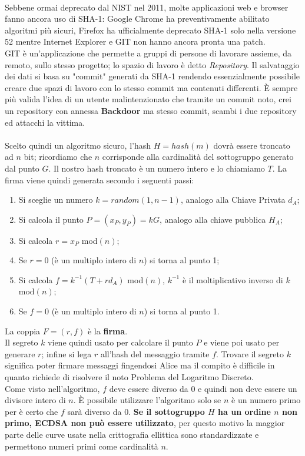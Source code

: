 \documentclass[a4paper,12pt]{tesiinfo}
\begin{document}
\\
Sebbene ormai deprecato dal NIST nel 2011, molte applicazioni web e browser fanno ancora uso di SHA-1: Google Chrome ha preventivamente abilitato algoritmi più sicuri, Firefox ha ufficialmente deprecato SHA-1 solo nella versione 52 mentre Internet Explorer e GIT non hanno ancora pronta una patch. \\
GIT \`e un'applicazione che permette a gruppi di persone di lavorare assieme, da remoto, sullo stesso progetto; lo spazio di lavoro \`e detto \textit{Repository}. Il salvataggio dei dati si basa su "commit" generati da SHA-1 rendendo essenzialmente possibile creare due spazi di lavoro con lo stesso commit ma contenuti differenti. \`E sempre pi\`u valida l'idea di un utente malintenzionato che tramite un commit noto, crei un repository con annessa \textbf{Backdoor} ma stesso commit, scambi i due repository ed attacchi la vittima.
\\
\\
Scelto quindi un algoritmo sicuro, l'hash $H = hash(m)$ dovr\`a essere troncato ad $n$ bit; ricordiamo che $n$ corrisponde alla cardinalit\`a del sottogruppo generato dal punto $G$. Il nostro hash troncato \`e un numero intero e lo chiamiamo $T$. La firma viene quindi generata secondo i seguenti passi:
\begin{enumerate}
    \item Si sceglie un numero $k = random(1, n-1)$, analogo alla Chiave Privata $d_A$;
    \item Si calcola il punto $P = (x_P, y_P) = kG$, analogo alla chiave pubblica $H_A$;
    \item Si calcola $r = x_P $ mod$(n)$;
    \item Se $r = 0$ (\`e un multiplo intero di $n$) si torna al punto 1;
    \item Si calcola $f = k^{-1} (T+rd_A) $ mod$(n)$, $k^{-1}$ \`e il moltiplicativo inverso di $k$ mod$(n)$;
    \item Se $f = 0$ (\`e un multiplo intero di $n$) si torna al punto 1.
\end{enumerate}
La coppia $F = (r, f)$ \`e la \textbf{firma}.
\\
Il segreto $k$ viene quindi usato per calcolare il punto $P$ e viene poi usato per generare $r$; infine si lega $r$ all'hash del messaggio tramite $f$. Trovare il segreto $k$ significa poter firmare messaggi fingendosi Alice ma il compito \`e difficile in quanto richiede di risolvere il noto Problema del Logaritmo Discreto.
\\
Come visto nell'algoritmo, $f$ deve essere diverso da $0$ e quindi non deve essere un divisore intero di $n$. \`E possibile utilizzare l'algoritmo solo se $n$ \`e un numero primo per \`e certo che $f$ sar\`a diverso da $0$. \textbf{Se il sottogruppo $H$ ha un ordine $n$ non primo, ECDSA non pu\`o essere utilizzato}, per questo motivo la maggior parte delle curve usate nella crittografia ellittica sono standardizzate e permettono numeri primi come cardinalit\`a $n$.
\end{document}
